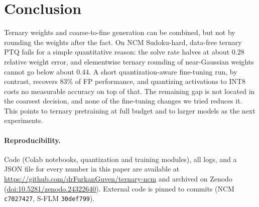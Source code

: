 \documentclass[11pt]{article}
\begin{document}
\section{Conclusion}

Ternary weights and coarse-to-fine generation can be combined, but not by rounding the weights after the fact. On NCM Sudoku-hard,
data-free ternary PTQ fails for a simple quantitative reason: the solve rate halves at about 0.28 relative weight error, and
elementwise ternary rounding of near-Gaussian weights cannot go below about 0.44. A short quantization-aware
fine-tuning run, by contrast, recovers 83\% of FP performance, and quantizing activations to INT8 costs no
measurable accuracy on top of that. The remaining gap is not located in the coarsest decision, and none of the
fine-tuning changes we tried reduces it. This points to ternary pretraining at full budget and to larger models
as the next experiments.

\paragraph{Reproducibility.}
Code (Colab notebooks, quantization and training modules), all logs, and a JSON file for every number in this
paper are available at \url{https://github.com/drFurkanGuven/ternary-ncm} and archived on Zenodo
(\href{https://doi.org/10.5281/zenodo.24322640}{doi:10.5281/zenodo.24322640}). External code is pinned to commits (NCM
\texttt{c7027427}, S-FLM \texttt{30def799}).



\end{document}
